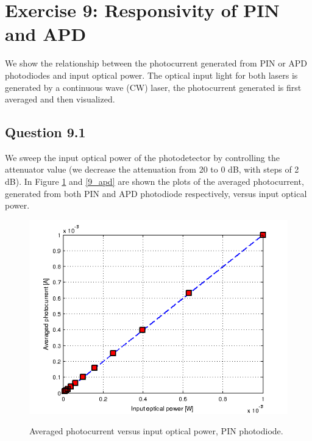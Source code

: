 \documentclass[a4paper,10pt]{report}
\begin{document}
\newpage
\section*{Exercise 9: Responsivity of PIN and APD}
We show the relationship between the photocurrent generated from PIN or APD photodiodes and input optical power.
The optical input light for both lasers is generated by a continuous wave (CW) laser, the photocurrent generated is first averaged and then visualized.

\subsection*{Question 9.1}
We sweep the input optical power of the photodetector by controlling the attenuator value (we decrease the attenuation from 20 to 0 dB, with steps of 2 dB).
In Figure \ref{9_pin} and \ref{9_apd} are shown the plots of the averaged photocurrent, generated from both PIN and APD photodiode respectively,
versus input optical power.

\begin{figure}[!ht]
  \centering
  \includegraphics[width=12cm]{9_pin.png}\\
  \caption{Averaged photocurrent versus input optical power, PIN photodiode.}
  \label{9_pin}
\end{figure}
\end{document}
